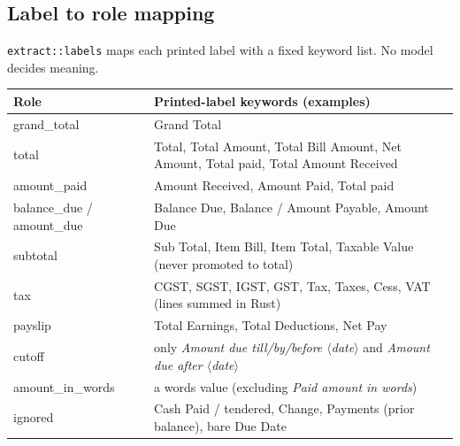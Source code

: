 \documentclass[11pt,a4paper]{article}
\begin{document}
\subsection{Label to role mapping}
\texttt{extract::labels} maps each printed label with a fixed keyword list. No model decides meaning.
\begin{center}\small
\begin{tabularx}{\textwidth}{@{}>{\ttfamily}p{4.2cm}X@{}}
\toprule
\normalfont Role & Printed-label keywords (examples)\\\midrule
grand\_total & Grand Total\\
total & Total, Total Amount, Total Bill Amount, Net Amount, Total paid, Total Amount Received\\
amount\_paid & Amount Received, Amount Paid, Total paid\\
balance\_due / amount\_due & Balance Due, Balance / Amount Payable, Amount Due\\
subtotal & Sub Total, Item Bill, Item Total, Taxable Value (never promoted to total)\\
tax & CGST, SGST, IGST, GST, Tax, Taxes, Cess, VAT (lines summed in Rust)\\
payslip & Total Earnings, Total Deductions, Net Pay\\
cutoff & only \emph{Amount due till/by/before $\langle$date$\rangle$} and \emph{Amount due after $\langle$date$\rangle$}\\
amount\_in\_words & a words value (excluding \emph{Paid amount in words})\\
ignored & Cash Paid / tendered, Change, Payments (prior balance), bare Due Date\\
\bottomrule
\end{tabularx}
\end{center}
\end{document}
